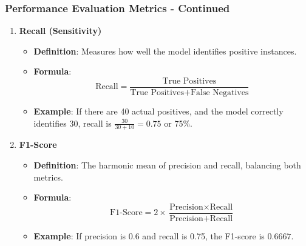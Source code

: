 \documentclass[aspectratio=169]{beamer}
\begin{document}
\begin{frame}[fragile]
    \frametitle{Performance Evaluation Metrics - Continued}
    \begin{enumerate}[resume]
        \item \textbf{Recall (Sensitivity)}
            \begin{itemize}
                \item \textbf{Definition}: Measures how well the model identifies positive instances.
                \item \textbf{Formula}:  
                    \[
                    \text{Recall} = \frac{\text{True Positives}}{\text{True Positives} + \text{False Negatives}}
                    \]
                \item \textbf{Example}: If there are 40 actual positives, and the model correctly identifies 30, recall is \( \frac{30}{30 + 10} = 0.75 \) or 75\%.
            \end{itemize}
        \item \textbf{F1-Score}
            \begin{itemize}
                \item \textbf{Definition}: The harmonic mean of precision and recall, balancing both metrics.
                \item \textbf{Formula}:  
                    \[
                    \text{F1-Score} = 2 \times \frac{\text{Precision} \times \text{Recall}}{\text{Precision} + \text{Recall}}
                    \]
                \item \textbf{Example}: If precision is 0.6 and recall is 0.75, the F1-score is \( 0.6667 \).
            \end{itemize}
    \end{enumerate}
\end{frame}
\end{document}
